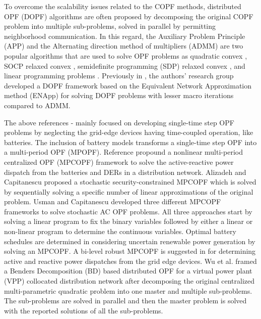 \documentclass{article}
\begin{document}
To overcome the scalability issues related to the COPF methods, distributed OPF (DOPF) algorithms are often proposed by decomposing the original COPF problem into multiple sub-problems, solved in parallel by permitting neighborhood communication. In this regard, the Auxiliary Problem Principle (APP) and the Alternating direction method of multipliers (ADMM) are two popular algorithms that are used to solve OPF problems as quadratic convex \cite{Fazio}, SOCP relaxed convex \cite{Zheng}, semidefinite programming (SDP) relaxed convex \cite{Wang, Biswas}, and linear programming problems \cite{Paul2}. Previously in \cite{Sadnan}, the authors' research group developed a DOPF framework based on the Equivalent Network Approximation method (ENApp) for solving DOPF problems with lesser macro iterations compared to ADMM.



The above references \cite{Wei}-\cite{Paul2} mainly focused on developing single-time step OPF problems by neglecting the grid-edge devices having time-coupled operation, like batteries. The inclusion of battery models transforms a single-time step OPF into a multi-period OPF (MPOPF). Reference \cite{Gabash} propound a nonlinear multi-period centralized OPF (MPCOPF) framework to solve the active-reactive power dispatch from the batteries and DERs in a distribution network. Alizadeh and Capitanescu \cite{Alizadeh} proposed a stochastic security-constrained MPCOPF which is solved by sequentially solving a specific number of linear approximations of the original problem. Usman and Capitanescu \cite{Usman} developed three different MPCOPF frameworks to solve stochastic AC OPF problems. All three approaches start by solving a linear program to fix the binary variables followed by either a linear or non-linear program to determine the continuous variables. Optimal battery schedules are determined in \cite{Aghdam, Fan} considering uncertain renewable power generation by solving an MPCOPF.  A bi-level robust MPCOPF is suggested in \cite{Zhang1} for determining active and reactive power dispatches from the grid edge devices. Wu et al. \cite{Wu} framed a Benders Decomposition (BD) based distributed OPF for a virtual power plant (VPP) collocated distribution network after decomposing the original centralized multi-parametric quadratic problem into one master and multiple sub-problems. The sub-problems are solved in parallel and then the master problem is solved with the reported solutions of all the sub-problems. 
\end{document}
